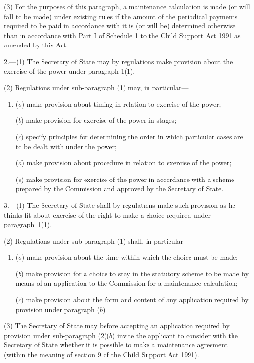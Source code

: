 \documentclass[12pt,a4paper]{article}
\begin{document}
(3) For the purposes of this paragraph, a maintenance calculation is made (or will fall to be made) under existing rules if the amount of the periodical payments required to be paid in accordance with it is (or will be) determined otherwise than in accordance with Part I of Schedule 1 to the Child Support Act 1991 as amended by this Act.

\medskip

2.---(1) The Secretary of State may by regulations make provision about the exercise of the power under paragraph 1(1).

(2) Regulations under sub-paragraph (1) may, in particular—
\begin{enumerate}\item[]
($a$) make provision about timing in relation to exercise of the power;

($b$) make provision for exercise of the power in stages;

($c$) specify principles for determining the order in which particular cases are to be dealt with under the power;

($d$) make provision about procedure in relation to exercise of the power;

($e$) make provision for exercise of the power in accordance with a scheme prepared by the Commission and approved by the Secretary of State.
\end{enumerate}

\medskip

3.---(1) The Secretary of State shall by regulations make such provision as he thinks fit about exercise of the right to make a choice required under paragraph~1(1).

(2) Regulations under sub-paragraph (1) shall, in particular—
\begin{enumerate}\item[]
($a$) make provision about the time within which the choice must be made;

($b$) make provision for a choice to stay in the statutory scheme to be made by means of an application to the Commission for a maintenance calculation;

($c$) make provision about the form and content of any application required by provision under paragraph ($b$).
\end{enumerate}

(3) The 
Secretary of State  %
may before accepting an application required by provision under sub-paragraph (2)($b$) invite the applicant to consider with the 
Secretary of State  %
whether it is possible to make a maintenance agreement (within the meaning of section 9 of the Child Support Act 1991).
\end{document}

